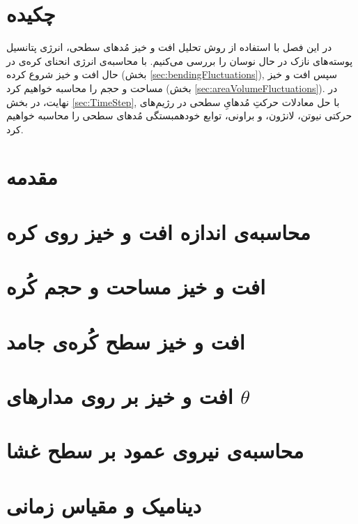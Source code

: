 \setRL
\clearpage
\def \MemFluc {\Mempath /MembraneFluc}

\section{
چکیده
}
در این فصل با استفاده از روش تحلیل افت و خیز مُدهای سطحی، انرژی پتانسیل پوسته‌های نازک در حال نوسان را بررسی می‌کنیم. با محاسبه‌ی انرژی انحنای کره‌ی در حال افت و خیز شروع کرده (بخش
\ref{sec:bendingFluctuations}),
سپس افت و خیز مساحت و حجم را محاسبه خواهیم کرد (بخش
\ref{sec:areaVolumeFluctuations}).
در نهایت، در بخش
\ref{sec:TimeStep},
 با حل معادلات حرکتِ مُدهایِ سطحی در رژیم‌های حرکتی نیوتن، لانژون، و براونی، توابع خودهمبستگی مُدهای سطحی را محاسبه خواهیم کرد.

\section{
مقدمه
}



\section{
محاسبه‌ی اندازه افت و خیز روی کره
\label{sec:bendingFluctuations}
}


\section{\label{sec:areaVolumeFluctuations}
افت و خیز مساحت و حجم کُره
}


\section{
افت و خیز سطح کُره‌ی جامد
}


\section{
افت و خیز بر روی مدارهای
$\theta$
}


\section{
محاسبه‌ی نیروی عمود بر سطح غشا
\label{sec:NormalForceDerivation}}


\section{\label{sec:TimeStep}
دینامیک و مقیاس زمانی
}







